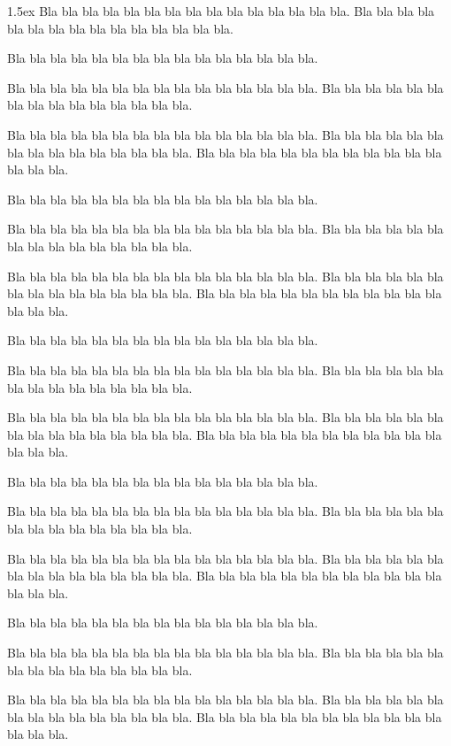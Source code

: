 \documentclass{article}
\makeatletter
\newenvironment{titlebox}[1]{%
		   \fboxrule0.4pt
		   \let\breakboxparindent\z@
		   \def\bkvz@bottom{\hrule\@height\fboxrule}%
		   \let\bkvz@before@breakbox\medbreak
		   \def\bkvz@set@linewidth{\advance\linewidth\dimexpr-2\fboxrule-2\fboxsep}%
		   \def\bkvz@left{\vrule\@width\fboxrule\hskip\fboxsep}%
		   \def\bkvz@right{\hskip\fboxsep\vrule\@width\fboxrule}%
		   \def\bkvz@top{\hbox to \hsize{%
		      \vrule\@width\fboxrule\@height\fboxrule
		      \leaders\hrule\@height\fboxrule\hskip1cm %
		      \begingroup
		         \fboxsep1pt
		         \setbox\z@\hbox{\kern0.5ex #1\kern0.5ex }%
		         \setbox\z@\hbox{\lower\dimexpr(\ht\z@-\dp\z@)/2\hbox{\fbox{\box\z@}}}%
		         \dp\z@\z@\ht\z@\z@\box\z@%
		      \endgroup
		      \leaders\hrule\@height\fboxrule\hskip0pt plus 1fil
		      \vrule\@width\fboxrule\@height\fboxrule}}%
		   \breakbox\kern1.5ex\relax}\endbreakbox
\makeatother
\begin{document}
\begin{titlebox}{Définition}
	Bla bla bla bla bla bla bla bla bla bla bla bla bla bla bla.
	Bla bla bla bla bla bla bla bla bla bla bla bla bla bla bla.
	
	Bla bla bla bla bla bla bla bla bla bla bla bla bla bla bla.
	
	Bla bla bla bla bla bla bla bla bla bla bla bla bla bla bla.
	Bla bla bla bla bla bla bla bla bla bla bla bla bla bla bla.
	
	Bla bla bla bla bla bla bla bla bla bla bla bla bla bla bla.
	Bla bla bla bla bla bla bla bla bla bla bla bla bla bla bla.
	Bla bla bla bla bla bla bla bla bla bla bla bla bla bla bla.
	
	Bla bla bla bla bla bla bla bla bla bla bla bla bla bla bla.
	
	Bla bla bla bla bla bla bla bla bla bla bla bla bla bla bla.
	Bla bla bla bla bla bla bla bla bla bla bla bla bla bla bla.
	
	Bla bla bla bla bla bla bla bla bla bla bla bla bla bla bla.
	Bla bla bla bla bla bla bla bla bla bla bla bla bla bla bla.
	Bla bla bla bla bla bla bla bla bla bla bla bla bla bla bla.
	
	Bla bla bla bla bla bla bla bla bla bla bla bla bla bla bla.
	
	Bla bla bla bla bla bla bla bla bla bla bla bla bla bla bla.
	 Bla bla bla bla bla bla bla bla bla bla bla bla bla bla bla.
	
	Bla bla bla bla bla bla bla bla bla bla bla bla bla bla bla.
	Bla bla bla bla bla bla bla bla bla bla bla bla bla bla bla.
	Bla bla bla bla bla bla bla bla bla bla bla bla bla bla bla.
	
	Bla bla bla bla bla bla bla bla bla bla bla bla bla bla bla.
	
	Bla bla bla bla bla bla bla bla bla bla bla bla bla bla bla.
	Bla bla bla bla bla bla bla bla bla bla bla bla bla bla bla.
	
	Bla bla bla bla bla bla bla bla bla bla bla bla bla bla bla.
	Bla bla bla bla bla bla bla bla bla bla bla bla bla bla bla.
	Bla bla bla bla bla bla bla bla bla bla bla bla bla bla bla.
	
	Bla bla bla bla bla bla bla bla bla bla bla bla bla bla bla.
	
	Bla bla bla bla bla bla bla bla bla bla bla bla bla bla bla.
	Bla bla bla bla bla bla bla bla bla bla bla bla bla bla bla.
	
	Bla bla bla bla bla bla bla bla bla bla bla bla bla bla bla.
	Bla bla bla bla bla bla bla bla bla bla bla bla bla bla bla.
	Bla bla bla bla bla bla bla bla bla bla bla bla bla bla bla.
	

\end{titlebox}
\end{document}

